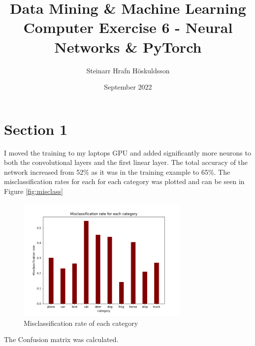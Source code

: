 \documentclass{article}
\title{Data Mining \& Machine Learning \\ \large Computer Exercise 6 - Neural Networks \& PyTorch}
\author{Steinarr Hrafn Höskuldsson}
\date{September 2022}
\newcommand{\mycomment}[1]{}
\begin{document}
\maketitle

\mycomment{
\begin{figure}[h]
    \centering
    \texttt{[image: LAB3/Basic1.png]}
    \caption{"Switch test" Breadboard set up}
    \label{fig:Switch_test}
\end{figure}


}
\section*{Section 1}
I moved the training to my laptops GPU and added significantly more neurons to both the convolutional layers and the first linear layer. The total accuracy of the network increased from 52\% as it was in the training example to 65\%. The misclassification rates for each for each category was plotted and can be seen in Figure \ref{fig:misclass}
\begin{figure}[h]
    \centering
    \includegraphics[width=0.75\textwidth]{06_neural_networks/1.png}
    \caption{Misclassification rate of each category}
    \label{fig:misclass
    }
\end{figure}
\newpage
The Confusion matrix was calculated.
\end{document}
